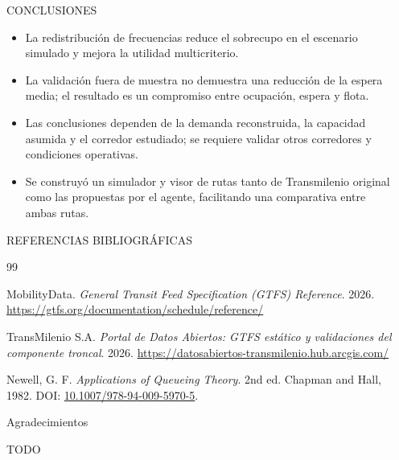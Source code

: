 \documentclass[final]{beamer}
\newlength{\sepwidth}
\newlength{\colwidth}
\newcommand{\separatorcolumn}{\begin{column}{\sepwidth}\end{column}}
\begin{document}
\begin{frame}[t]
\begin{columns}[t]
\begin{column}{\colwidth}
      \begin{block}{CONCLUSIONES}

        \begin{itemize}
          \item La redistribución de frecuencias reduce el sobrecupo en el escenario simulado y mejora la utilidad multicriterio.
          \item La validación fuera de muestra no demuestra una reducción de la espera media; el resultado es un compromiso entre ocupación, espera y flota.
          \item Las conclusiones dependen de la demanda reconstruida, la capacidad asumida y el corredor estudiado; se requiere validar otros corredores y condiciones operativas.
          \item Se construyó un simulador y visor de rutas tanto de Transmilenio original como las propuestas por el agente, facilitando una comparativa entre ambas rutas.
        \end{itemize}

      \end{block}

      \begin{block}{REFERENCIAS BIBLIOGRÁFICAS}

        \begin{thebibliography}{99}

          MobilityData. \textit{General Transit Feed Specification (GTFS) Reference}. 2026.
          \url{https://gtfs.org/documentation/schedule/reference/}

          TransMilenio S.A. \textit{Portal de Datos Abiertos: GTFS estático y validaciones del componente troncal}. 2026.
          \url{https://datosabiertos-transmilenio.hub.arcgis.com/}

          Newell, G. F. \textit{Applications of Queueing Theory}. 2nd ed. Chapman and Hall, 1982.
          DOI: \url{10.1007/978-94-009-5970-5}.


        \end{thebibliography}


      \end{block}

      \begin{block}{Agradecimientos}

        TODO

      \end{block}

    \end{column}
    \separatorcolumn



  \end{columns}
\end{frame}
\end{document}
